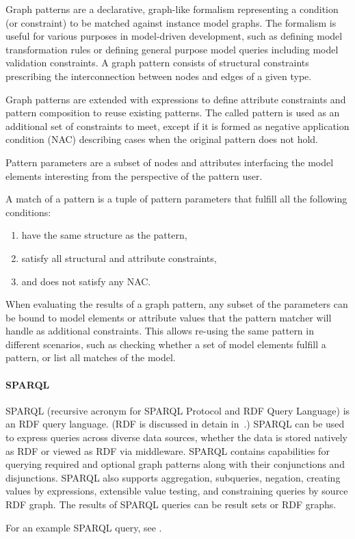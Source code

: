  Graph patterns are a declarative, graph-like formalism representing a
 condition (or constraint) to be matched against instance model graphs. The
 formalism is useful for various purposes in model-driven development, such as
 defining model transformation rules or defining general purpose model queries
 including model validation constraints. A graph pattern consists of structural
 constraints prescribing the interconnection between nodes and edges of a given
 type.

 Graph patterns are extended with expressions to define attribute constraints and
 pattern composition to reuse existing patterns. The called pattern is used as
 an additional set of constraints to meet, except if it is formed as negative
 application condition (NAC) describing cases when the original pattern does not hold.

 Pattern parameters are a subset of nodes and attributes interfacing the
 model elements interesting from the perspective of the pattern user.

 A match of a pattern is a tuple of pattern parameters that fulfill all the following conditions:

 \begin{enumerate}
 	\item have the same structure as the pattern,
 	\item satisfy all structural and attribute constraints,
 	\item and does not satisfy any NAC.
 \end{enumerate}

 When evaluating the results of a graph pattern, any subset of the parameters
 can be bound to model elements or attribute values that the pattern matcher
 will handle as additional constraints. This allows re-using the same pattern
 in different scenarios, such as checking whether a set of model elements
 fulfill a pattern, or list all matches of the model.

 \paragraph{SPARQL}
 \label{sect:sparql}
 SPARQL (recursive acronym for SPARQL Protocol and RDF Query Language) is an RDF query language. (RDF is discussed in detain in~.) SPARQL can be used to express queries across diverse data sources, whether the data is stored natively as RDF or viewed as RDF via middleware. SPARQL contains capabilities for querying required and optional graph patterns along with their conjunctions and disjunctions. SPARQL also supports aggregation, subqueries, negation, creating values by expressions, extensible value testing, and constraining queries by source RDF graph. The results of SPARQL queries can be result sets or RDF graphs.~\cite{W3C-SPARQL,Harris:13:SQL}

 For an example SPARQL query, see .
